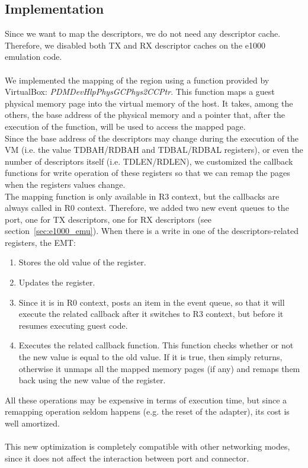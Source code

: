 \documentclass[a4paper, 12pt, titlepage]{report}
\begin{document}
\subsection{Implementation}
Since we want to map the descriptors, we do not need any descriptor cache. Therefore, we disabled both TX and RX descriptor caches on the e1000 emulation code.
\\
\\
We implemented the mapping of the region using a function provided by VirtualBox: \textit{PDMDevHlpPhysGCPhys2CCPtr}. This function maps a guest physical memory page into the virtual memory of the host. It takes, among the others, the base address of the physical memory and a pointer that, after the execution of the function, will be used to access the mapped page.
\\
Since the base address of the descriptors may change during the execution of the VM (i.e. the value TDBAH/RDBAH and TDBAL/RDBAL registers), or even the number of descriptors itself (i.e. TDLEN/RDLEN), we customized the callback functions for write operation of these registers so that we can remap the pages when the registers values change.
\\
The mapping function is only available in R3 context, but the callbacks are always called in R0 context. Therefore, we added two new event queues to the port, one for TX descriptors, one for RX descriptors (see section~\ref{sec:e1000_emu}). When there is a write in one of the descriptors-related registers, the EMT:
\begin{enumerate}
\item Stores the old value of the register.
\item Updates the register.
\item Since it is in R0 context, posts an item in the event queue, so that it will execute the related callback after it switches to R3 context, but before it resumes executing guest code.
\item Executes the related callback function. This function checks whether or not the new value is equal to the old value. If it is true, then simply returns, otherwise it unmaps all the mapped memory pages (if any) and remaps them back using the new value of the register.
\end{enumerate}
All these operations may be expensive in terms of execution time, but since a remapping operation seldom happens (e.g. the reset of the adapter), its cost is well amortized.
\\
\\
This new optimization is completely compatible with other networking modes, since it does not affect the interaction between port and connector.
\end{document}
